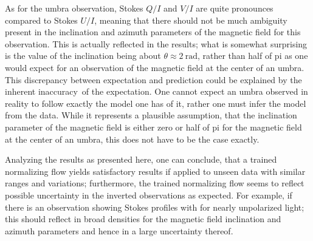 \documentclass[a4paper,12pt]{report}
\begin{document}
As for the umbra observation, Stokes $Q/I$ and $V/I$ are quite pronounces compared to Stokes $U/I$, meaning that there should not be much ambiguity present in the inclination and azimuth parameters of the magnetic field for this observation. This is actually reflected in the results; what is somewhat surprising is the value of the inclination being about $\theta \approx \SI{2}{\radian}$, rather than half of pi as one would expect for an observation of the magnetic field at the center of an umbra. This discrepancy between expectation and prediction could be explained by the inherent \flqq inaccuracy\frqq\ of the expectation. One cannot expect an umbra observed in reality to follow exactly the model one has of it, rather one must infer the model from the data. While it represents a plausible assumption, that the inclination parameter of the magnetic field is either zero or half of pi for the magnetic field at the center of an umbra, this does not have to be the case exactly.

Analyzing the results as presented here, one can conclude, that a trained normalizing flow yields satisfactory results if applied to unseen data with similar ranges and variations; furthermore, the trained normalizing flow seems to reflect possible uncertainty in the inverted observations as expected. For example, if there is an observation showing Stokes profiles with for nearly unpolarized light; this should reflect in broad densities for the magnetic field inclination and azimuth parameters and hence in a large uncertainty thereof.
\end{document}
